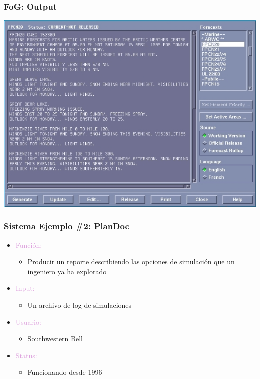 \documentclass[compress,color=usenames]{beamer}
\newcommand{\mH}[1]{\textcolor{Plum}{#1}}
\begin{document}
\begin{frame}
\frametitle{FoG: Output}

\begin{center}
\includegraphics[scale=.4]{pics/pic3.jpg}
\end{center}

\end{frame}

\begin{frame}
\frametitle{Sistema Ejemplo \#2: PlanDoc}

\begin{itemize}
\item \mH{Funci\'on: }
\begin{itemize}
\item Producir un reporte describiendo las opciones de simulaci\'on que un ingeniero ya ha explorado
\end{itemize}
\item \mH{Input: }
\begin{itemize}
\item Un archivo de log de simulaciones
\end{itemize}
\item \mH{Usuario: }
\begin{itemize}
\item Southwestern Bell
\end{itemize}
\item \mH{Status: }
\begin{itemize}
\item Funcionando desde 1996
\end{itemize}
\end{itemize}

\end{frame}
\end{document}
